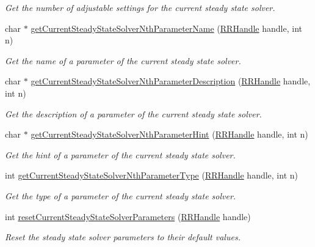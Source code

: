 \begin{DoxyCompactItemize}
\begin{DoxyCompactList}\small\item\em Get the number of adjustable settings for the current steady state solver. \end{DoxyCompactList}\item 
char $\ast$ \hyperlink{group__simopts_gae7bae8b195623a1f170422b4257bc97b}{get\+Current\+Steady\+State\+Solver\+Nth\+Parameter\+Name} (\hyperlink{rrc__types_8h_a1d68f0592372208fa5a5f2799ea4b3ae}{R\+R\+Handle} handle, int n)
\begin{DoxyCompactList}\small\item\em Get the name of a parameter of the current steady state solver. \end{DoxyCompactList}\item 
char $\ast$ \hyperlink{group__simopts_gae8ec0f65a3425758d77f43ed8ce21ce3}{get\+Current\+Steady\+State\+Solver\+Nth\+Parameter\+Description} (\hyperlink{rrc__types_8h_a1d68f0592372208fa5a5f2799ea4b3ae}{R\+R\+Handle} handle, int n)
\begin{DoxyCompactList}\small\item\em Get the description of a parameter of the current steady state solver. \end{DoxyCompactList}\item 
char $\ast$ \hyperlink{group__simopts_gae77505cd72c88e472c6e6b8f967aa263}{get\+Current\+Steady\+State\+Solver\+Nth\+Parameter\+Hint} (\hyperlink{rrc__types_8h_a1d68f0592372208fa5a5f2799ea4b3ae}{R\+R\+Handle} handle, int n)
\begin{DoxyCompactList}\small\item\em Get the hint of a parameter of the current steady state solver. \end{DoxyCompactList}\item 
int \hyperlink{group__simopts_ga77dcaf609de8b7c9ff829e26f02695b0}{get\+Current\+Steady\+State\+Solver\+Nth\+Parameter\+Type} (\hyperlink{rrc__types_8h_a1d68f0592372208fa5a5f2799ea4b3ae}{R\+R\+Handle} handle, int n)
\begin{DoxyCompactList}\small\item\em Get the type of a parameter of the current steady state solver. \end{DoxyCompactList}\item 
int \hyperlink{group__simopts_gafccd26495f4b099700e8f52fdb20794a}{reset\+Current\+Steady\+State\+Solver\+Parameters} (\hyperlink{rrc__types_8h_a1d68f0592372208fa5a5f2799ea4b3ae}{R\+R\+Handle} handle)
\begin{DoxyCompactList}\small\item\em Reset the steady state solver parameters to their default values. \end{DoxyCompactList}\item 

\end{DoxyCompactItemize}
